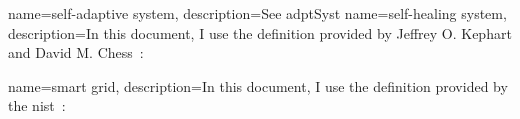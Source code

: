 {
	name={self-adaptive system},
	description={See \gls{adptSyst}}
}
{
	name={self-healing system},
	description={In this document, I use the definition provided by Jeffrey O. Kephart and David M. Chess~\cite{DBLP:journals/computer/KephartC03}: }
}

{
	name={smart grid},
	description={In this document, I use the definition provided by the \gls{nist}~\cite{NIST:SmartGrid:Def:What}: }
}